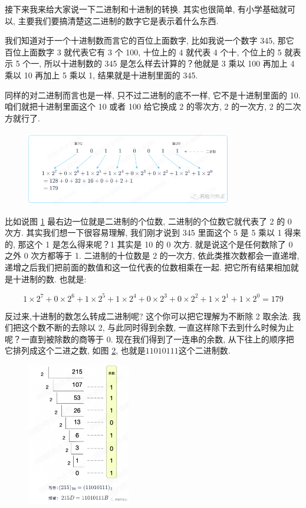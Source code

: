 接下来我来给大家说一下二进制和十进制的转换. 其实也很简单, 有小学基础就可以, 主要我们要搞清楚这二进制的数字它是表示着什么东西. 

我们知道对于一个十进制数而言它的百位上面数字, 比如我说一个数字 345, 那它百位上面数字 3 就代表它有 3 个 100, 十位上的 4 就代表 4 个十, 个位上的 5 就表示 5 个一, 所以十进制数的 345 是怎么样去计算的？他就是 3 乘以 100 再加上 4 乘以 10 再加上 5 乘以 1, 结果就是十进制里面的 345. 

同样的对二进制而言也是一样, 只不过二进制的底不一样, 它不是十进制里面的 10. 咱们就把十进制里面这个 10 或者 100 给它换成 2 的零次方, 2 的一次方, 2 的二次方就行了. 

\begin{figure}[ht]
  \centering\includegraphics[width=0.8\textwidth]{asset/20231227140607.png}
  \caption{}
  \label{fig:img2_12}
\end{figure}

比如说图 \ref{fig:img2_12} 最右边一位就是二进制的个位数, 二进制的个位数它就代表了 2 的 0 次方. 其实我们想一下很容易理解, 我们刚才说到 345 里面这个 5 是 5 乘以 1 得来的, 那这个 1 是怎么得来呢？1 其实是 10 的 0 次方. 就是说这个是任何数除了 0 之外 0 次方都等于 1. 二进制的十位数是 2 的一次方, 依此类推次数都会一直递增, 递增之后我们把前面的数值和这一位代表的位数相乘在一起. 把它所有结果相加就是十进制的数. 也就是:

\[
  1\times2^7+0\times2^6+1\times2^5+1\times2^4+0\times2^3+0\times2^2+1\times2^1+1\times2^0=179
\]

反过来,十进制的数怎么转成二进制呢? 这个你可以把它理解为不断除 2 取余法. 我们把这个数不断的去除以 2, 与此同时得到余数, 一直这样除下去到什么时候为止呢？一直到被除数的商等于 0. 现在我们得到了一连串的余数, 从下往上的顺序把它排列成这个二进之数, 如图 \ref{fig:img2_13}, 也就是$11010111$这个二进制数. 

\begin{figure}[ht]
  \centering\includegraphics[width=0.4\textwidth]{asset/20231227140715.png}
  \caption{}
  \label{fig:img2_13}
\end{figure}

